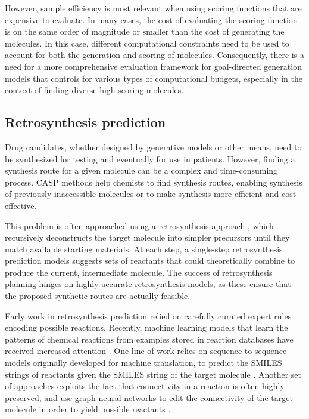 However, sample efficiency is most relevant when using scoring functions that are expensive to
evaluate. In many cases, the cost of evaluating the scoring function is on the same order of
magnitude or smaller than the cost of generating the molecules. In this case, different
computational constraints need to be used to account for both the generation and scoring of
molecules. Consequently, there is a need for a more comprehensive evaluation framework for
goal-directed generation models that controls for various types of computational budgets, especially
in the context of finding diverse high-scoring molecules.

\subsection{Retrosynthesis prediction}
Drug candidates, whether designed by generative models or other means, need to be
synthesized for testing and eventually for use in patients. However, finding a synthesis route for a
given molecule can be a complex and time-consuming process. \Ac{CASP} methods help
chemists to find synthesis routes, enabling synthesis of previously inaccessible molecules or to make
synthesis more efficient and cost-effective.

This problem is often approached using a retrosynthesis approach
\citep{coreyLogicChemicalSynthesis1989}, which
recursively deconstructs the target molecule into simpler precursors until they match available
starting materials. At each step, a single-step retrosynthesis prediction models suggests sets of
reactants that could theoretically combine to produce the current, intermediate molecule.
The success of retrosynthesis planning hinges on highly accurate retrosynthesis models, as these
ensure that the proposed synthetic routes are actually feasible.

Early work in retrosynthesis prediction relied on carefully curated expert rules encoding possible
reactions. Recently, machine learning models that learn the patterns of chemical reactions from
examples stored in reaction databases have received increased attention
\citep{coleyMachineLearningComputerAided2018,strieth-kalthoffMachineLearningRopes2020,seglerNeuralSymbolicMachineLearning2017,seglerPlanningChemicalSyntheses2018}. One line of
work relies on sequence-to-sequence models originally developed for machine translation, to predict
the SMILES strings of reactants given the SMILES string of the target molecule
\citep{schwallerMolecularTransformerModel2019,namLinkingNeuralMachine2016,schwallerFoundTranslationPredicting2018,karpovTransformerModelRetrosynthesis2019,tetkoStateartAugmentedNLP2020}.
Another set of approaches exploits the fact that connectivity in a reaction is often highly
preserved, and use graph neural networks to edit the connectivity of the target molecule in order to
yield possible reactants
\citep{sachaMoleculeEditGraph2021,shiGraphGraphsFramework2020,somnathLearningGraphModels2021,yanRetroXpertDecomposeRetrosynthesis2020}.


